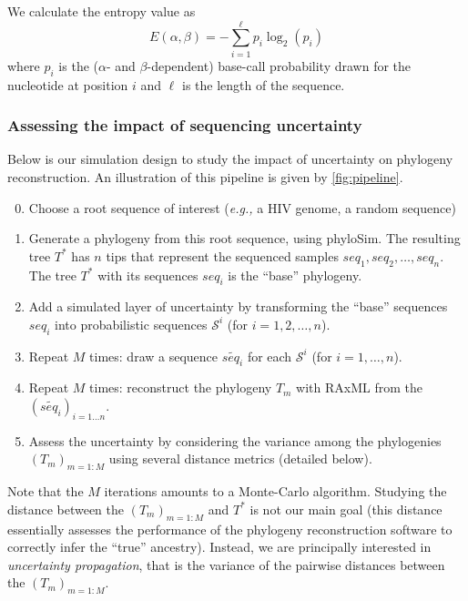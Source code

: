 \documentclass[10pt]{article}
\newcommand{\eg}{\textit{e.g.,}\xspace}
\newcommand{\nps}{\mathcal{S}} %
\begin{document}
We calculate the entropy value as 
\begin{equation}
\label{eq:entropyDefinition}
E(\alpha, \beta) = -\sum_{i=1}^{\ell} p_i \log_2(p_i)
\end{equation}
where $p_i$ is the ($\alpha$- and $\beta$-dependent) base-call probability drawn for the nucleotide at position $i$ and $\ell$ is the length of the sequence.




\subsubsection{Assessing the impact of sequencing uncertainty}


Below is our simulation design to study the impact of uncertainty on phylogeny reconstruction.
An illustration of this pipeline is given by \autoref{fig:pipeline}.

\begin{enumerate}
\setcounter{enumi}{-1} 

\item Choose a root sequence of interest (\eg a HIV genome, a random sequence)

\item Generate a phylogeny from this root sequence, using \textsf{phyloSim}. The resulting tree $T^*$ has $n$ tips that represent the sequenced samples $seq_1, seq_2,\ldots, seq_n$. The tree $T^*$ with its sequences $seq_i$ is the ``base'' phylogeny.

\item Add a simulated layer of uncertainty by transforming the ``base'' sequences $seq_i$ into probabilistic sequences $\nps^i$ (for $i=1,2,\ldots,n$).

\item Repeat $M$ times: 
draw a sequence $\widetilde{seq_i}$ for each $\nps^i$ (for $i=1,\ldots, n$).

\item Repeat $M$ times: reconstruct the phylogeny $T_m$ with \textsf{RAxML} from the $(\widetilde{seq_i})_{i=1\ldots n}$. 

\item \label{item:assess} Assess the uncertainty by considering the variance among the phylogenies $(T_m)_{m=1:M}$ using several distance metrics (detailed below).
\end{enumerate}

\noindent Note that the $M$ iterations amounts to a Monte-Carlo algorithm.
Studying the distance between the $(T_m)_{m=1:M}$ and $T^*$ is not our main goal (this distance essentially assesses the performance of the phylogeny reconstruction software to correctly infer the ``true'' ancestry).
Instead, we are principally interested in \emph{uncertainty propagation}, that is the variance of the pairwise distances between the $(T_m)_{m=1:M}$.
\end{document}

